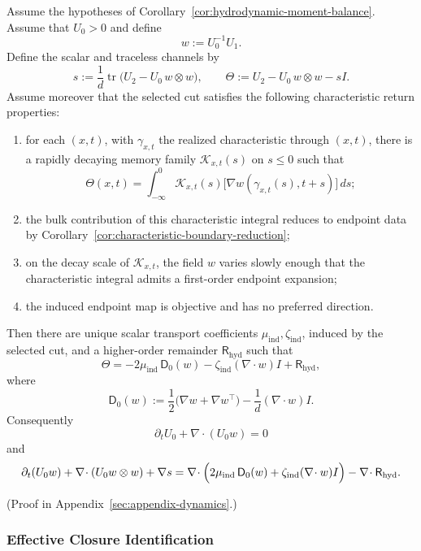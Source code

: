 \begin{theorem}
\label{cor:hydrodynamic-closure-law}
Assume the hypotheses of Corollary~\ref{cor:hydrodynamic-moment-balance}.
Assume that \(U_0>0\) and define
\[
w:=U_0^{-1}U_1.
\]
Define the scalar and traceless channels by
\[
s:=\frac{1}{d}\operatorname{tr}\bigl(U_2-U_0\,w\otimes w\bigr),
\qquad
\Theta:=U_2-U_0\,w\otimes w-sI.
\]
Assume moreover that the selected cut satisfies the following characteristic
return properties:
\begin{enumerate}[label=(\roman*),itemsep=0.2em]
\item for each \((x,t)\), with \(\gamma_{x,t}\) the realized characteristic
      through \((x,t)\), there is a rapidly decaying memory family
      \(\mathcal K_{x,t}(s)\) on \(s\le 0\) such that
      \[
      \Theta(x,t)
      =
      \int_{-\infty}^0
      \mathcal K_{x,t}(s)\bigl[\nabla w(\gamma_{x,t}(s),t+s)\bigr]\,ds;
      \]
\item the bulk contribution of this characteristic integral reduces to endpoint
      data by Corollary~\ref{cor:characteristic-boundary-reduction};
\item on the decay scale of \(\mathcal K_{x,t}\), the field \(w\) varies
      slowly enough that the characteristic integral admits a first-order
      endpoint expansion;
\item the induced endpoint map is objective and has no preferred direction.
\end{enumerate}
Then there are unique scalar transport coefficients
\(\mu_{\mathrm{ind}},\zeta_{\mathrm{ind}}\), induced by the selected cut, and a
higher-order remainder \(\mathsf R_{\mathrm{hyd}}\) such that
\[
\Theta
=
-2\mu_{\mathrm{ind}}\,\mathsf D_0(w)
-\zeta_{\mathrm{ind}}(\nabla\!\cdot w)I
+\mathsf R_{\mathrm{hyd}},
\]
where
\[
\mathsf D_0(w)
:=
\frac{1}{2}\bigl(\nabla w+\nabla w^\top\bigr)
-\frac{1}{d}(\nabla\!\cdot w)I.
\]
Consequently
\[
\partial_t U_0 + \nabla\!\cdot(U_0 w)=0
\]
and
\[
\partial_t(U_0 w)
+
\nabla\!\cdot(U_0 w\otimes w)
+
\nabla s
=
\nabla\!\cdot\Bigl(
2\mu_{\mathrm{ind}}\,\mathsf D_0(w)
+
\zeta_{\mathrm{ind}}(\nabla\!\cdot w)I
\Bigr)
-\nabla\!\cdot \mathsf R_{\mathrm{hyd}}.
\]
\end{theorem}

(Proof in Appendix~\ref{sec:appendix-dynamics}.)

\subsubsection{Effective Closure Identification}

